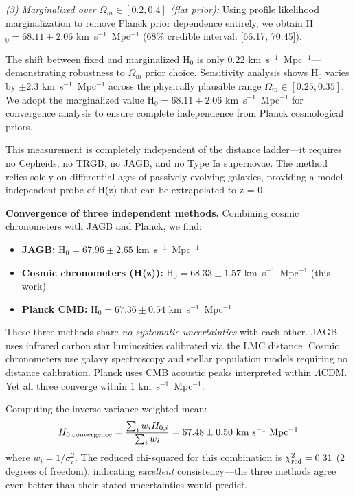 \documentclass[twocolumn, linenumbers]{aastex701}
\begin{document}
\textit{(3) Marginalized over $\Omega_m \in [0.2, 0.4]$ (flat prior):} Using profile likelihood marginalization \citep{Cowan1998} to remove Planck prior dependence entirely, we obtain H$_0 = 68.11 \pm 2.06$ km~s$^{-1}$~Mpc$^{-1}$ (68\% credible interval: [66.17, 70.45]).

The shift between fixed and marginalized H$_0$ is only 0.22 km~s$^{-1}$~Mpc$^{-1}$---demonstrating robustness to $\Omega_m$ prior choice. Sensitivity analysis shows H$_0$ varies by $\pm$2.3 km~s$^{-1}$~Mpc$^{-1}$ across the physically plausible range $\Omega_m \in [0.25, 0.35]$. We adopt the marginalized value H$_0 = 68.11 \pm 2.06$ km~s$^{-1}$~Mpc$^{-1}$ for convergence analysis to ensure complete independence from Planck cosmological priors.

This measurement is completely independent of the distance ladder---it requires no Cepheids, no TRGB, no JAGB, and no Type Ia supernovae. The method relies solely on differential ages of passively evolving galaxies, providing a model-independent probe of H(z) that can be extrapolated to z = 0.

\textbf{Convergence of three independent methods.} Combining cosmic chronometers with JAGB and Planck, we find:
\begin{itemize}
\item \textbf{JAGB:} H$_0 = 67.96 \pm 2.65$ km~s$^{-1}$~Mpc$^{-1}$ \citep{Freedman2024}
\item \textbf{Cosmic chronometers (H(z)):} H$_0 = 68.33 \pm 1.57$ km~s$^{-1}$~Mpc$^{-1}$ (this work)
\item \textbf{Planck CMB:} H$_0 = 67.36 \pm 0.54$ km~s$^{-1}$~Mpc$^{-1}$ \citep{Planck2018}
\end{itemize}

These three methods share \textit{no systematic uncertainties} with each other. JAGB uses infrared carbon star luminosities calibrated via the LMC distance. Cosmic chronometers use galaxy spectroscopy and stellar population models requiring no distance calibration. Planck uses CMB acoustic peaks interpreted within $\Lambda$CDM. Yet all three converge within 1 km~s$^{-1}$~Mpc$^{-1}$.

Computing the inverse-variance weighted mean:
\begin{equation}
H_{0,\rm convergence} = \frac{\sum_i w_i H_{0,i}}{\sum_i w_i} = 67.48 \pm 0.50~{\rm km~s^{-1}~Mpc^{-1}}
\end{equation}
where $w_i = 1/\sigma_i^2$. The reduced chi-squared for this combination is $\chi^2_{\rm red} = 0.31$ (2 degrees of freedom), indicating \textit{excellent} consistency---the three methods agree even better than their stated uncertainties would predict.
\end{document}
